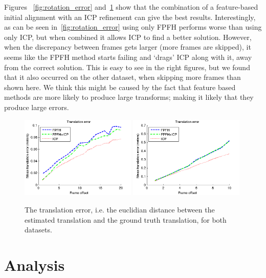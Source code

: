 \documentclass[a4paper]{article}
\begin{document}
Figures ~\ref{fig:rotation_error} and~\ref{fig:translation_error} show that the combination of a feature-based initial alignment with an \ac{ICP} refinement can give the best results. Interestingly, as can be seen in~\ref{fig:rotation_error} using only \ac{FPFH} performs worse than using only \ac{ICP}, but when combined it allows \ac{ICP} to find a better solution. However, when the discrepancy between frames gets larger (more frames are skipped), it seems like the \ac{FPFH} method starts failing and `drags' \ac{ICP} along with it, away from the correct solution. This is easy to see in the right figures, but we found that it also occurred on the other dataset, when skipping more frames than shown here. We think this might be caused by the fact that feature based methods are more likely to produce large transforms; making it likely that they produce large errors. 


\begin{figure}[H]
    \centering
        \includegraphics[width=0.49\textwidth]{ims/xyzTranslationerror.png}
        \includegraphics[width=0.49\textwidth]{ims/deskTranslationerror.png}
    \caption{The translation error, i.e. the euclidian distance between the estimated translation and the ground truth translation, for both datasets.}
    \label{fig:translation_error}
\end{figure}


\section{Analysis}
\end{document}
